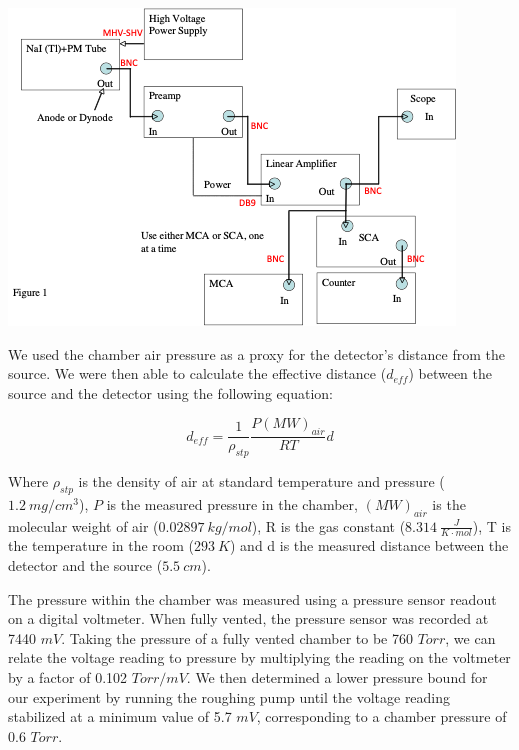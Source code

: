 \documentclass[10pt]{article}
\newenvironment{Figure}
{\par\medskip\noindent\minipage{\linewidth}}
{\endminipage\par\medskip}
\begin{document}
\begin{multicols}{2}
\begin{Figure}
	\includegraphics[width=\textwidth,keepaspectratio]{elec_diag_2.png}
\end{Figure} 

We used the chamber air pressure as a proxy for the detector's distance from the source.  We were then able to calculate the effective distance ($d_{eff}$) between the source and the detector using the following equation: 


\begin{equation} 
d_{eff} = \frac{1}{\rho_{stp}}\frac{P(MW)_{air}}{RT}d \label{deff}
\end{equation}

Where $\rho_{stp}$ is the density of air at standard temperature and pressure ($1.2 \ mg/cm^{3}$), $P$ is the measured pressure in the chamber, $(MW)_{air}$ is the molecular weight of air ($0.02897 \ kg/mol$), R is the gas constant ($8.314 \ \frac{J}{K \cdot mol}$), T is the temperature in the room ($293 \ K$) and d is the measured distance between the detector and the source ($5.5 \ cm$). \par

The pressure within the chamber was measured using a pressure sensor readout on a digital voltmeter.  When fully vented, the pressure sensor was recorded at 7440 $mV$.  Taking the pressure of a fully vented chamber to be 760 $Torr$, we can relate the voltage reading to pressure by multiplying the reading on the voltmeter by a factor of 0.102 $Torr/mV$.  We then determined a lower pressure bound for our experiment by running the roughing pump until the voltage reading stabilized at a minimum value of 5.7 $mV$, corresponding to a chamber pressure of 0.6 $Torr$. \par


\end{multicols}
\end{document}
